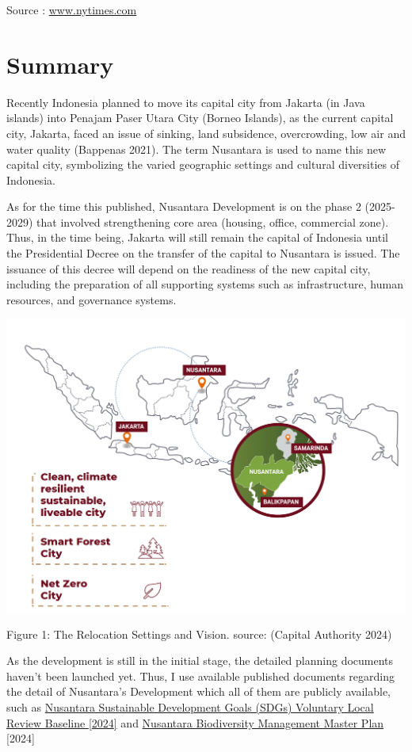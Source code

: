 \documentclass[
  letterpaper,
  DIV=11,
  numbers=noendperiod]{scrreprt}
\begin{document}
Source :
\href{https://www.nytimes.com/interactive/2023/05/16/headway/indonesia-nusantara-jakarta.html}{www.nytimes.com}

\hypertarget{summary-3}{%
\section{Summary}\label{summary-3}}

Recently Indonesia planned to move its capital city from Jakarta (in
Java islands) into Penajam Paser Utara City (Borneo Islands), as the
current capital city, Jakarta, faced an issue of sinking, land
subsidence, overcrowding, low air and water quality (Bappenas 2021). The
term Nusantara is used to name this new capital city, symbolizing the
varied geographic settings and cultural diversities of Indonesia.

As for the time this published, Nusantara Development is on the phase 2
(2025-2029) that involved strengthening core area (housing, office,
commercial zone). Thus, in the time being, Jakarta will still remain the
capital of Indonesia until the Presidential Decree on the transfer of
the capital to Nusantara is issued. The issuance of this decree will
depend on the readiness of the new capital city, including the
preparation of all supporting systems such as infrastructure, human
resources, and governance systems.

\includegraphics[width=6.07292in,height=\textheight]{images/clipboard-3462147358.png}

Figure 1: The Relocation Settings and Vision. source: (Capital Authority
2024)

As the development is still in the initial stage, the detailed planning
documents haven't been launched yet. Thus, I use available published
documents regarding the detail of Nusantara's Development which all of
them are publicly available, such as
\href{https://www.ikn.go.id/storage/pedoman-nusantara/2/nusantara-vlr-baseline-en.pdf}{Nusantara
Sustainable Development Goals (SDGs) Voluntary Local Review Baseline
{[}2024{]}} and
\href{https://ikn.go.id/storage/pedoman-nusantara/1/nusantara-biodiversity-management-master-plan-2024.pdf}{Nusantara
Biodiversity Management Master Plan} {[}2024{]}
\end{document}
